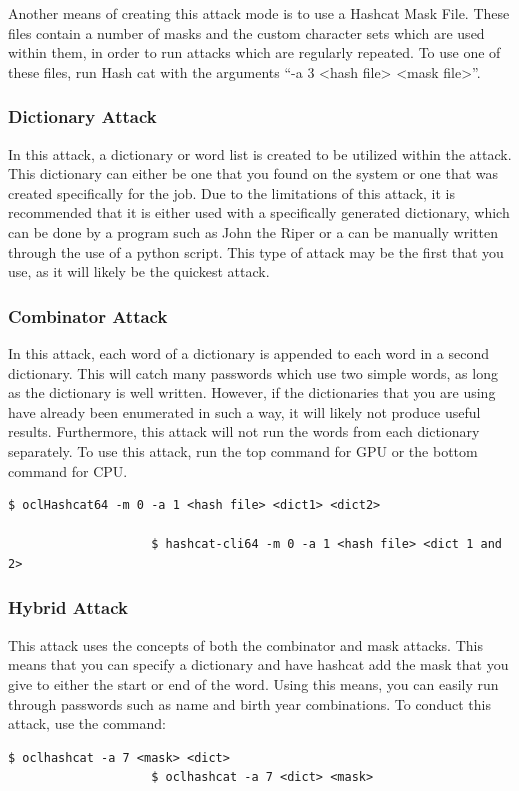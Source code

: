 				Another means of creating this attack mode is to use a Hashcat Mask File.
				These files contain a number of masks and the custom character sets which are used within them, in order to run attacks which are regularly repeated.
				To use one of these files, run Hash cat with the arguments ``-a 3 <hash file> <mask file>''.

			\subsubsection{Dictionary Attack}
				In this attack, a dictionary or word list is created to be utilized within the attack.
				This dictionary can either be one that you found on the system or one that was created specifically for the job.
				Due to the limitations of this attack, it is recommended that it is either used with a specifically generated dictionary, which can be done by a program such as John the Riper or
				a can be manually written through the use of a python script.
				This type of attack may be the first that you use, as it will likely be the quickest attack.
			\subsubsection{Combinator Attack}
				In this attack, each word of a dictionary is appended to each word in a second dictionary.
				This will catch many passwords which use two simple words, as long as the dictionary is well written.
				However, if the dictionaries that you are using have already been enumerated in such a way, it will likely not produce useful results.
				Furthermore, this attack will not run the words from each dictionary separately.
				To use this attack, run the top command for GPU or the bottom command for CPU.
				\begin{lstlisting}[style=CLI]
					$ oclHashcat64 -m 0 -a 1 <hash file> <dict1> <dict2>

					$ hashcat-cli64 -m 0 -a 1 <hash file> <dict 1 and 2>
				\end{lstlisting}
			\subsubsection{Hybrid Attack}
				This attack uses the concepts of both the combinator and mask attacks.
				This means that you can specify a dictionary and have hashcat add the mask that you give to either the start or end of the word.
				Using this means, you can easily run through passwords such as name and birth year combinations.
				To conduct this attack, use the command:
				\begin{lstlisting}[style=CLI]
					$ oclhashcat -a 7 <mask> <dict>
					$ oclhashcat -a 7 <dict> <mask>
				\end{lstlisting}

